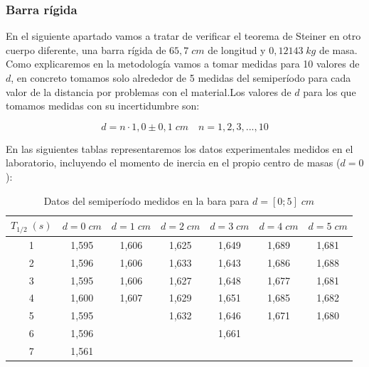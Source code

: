 \documentclass[a4paper,12pt,titlepage]{article}
\begin{document}
\subsubsection{Barra rígida}

En el siguiente apartado vamos a tratar de verificar el teorema de Steiner en otro cuerpo diferente, una barra rígida de $65,7 \; cm$ de longitud y $0,12143 \; kg$ de masa. Como explicaremos en la metodología vamos a tomar medidas para 10 valores de $d$, en concreto tomamos solo alrededor de 5 medidas del semiperíodo para cada valor de la distancia por problemas con el material.Los valores de $d$ para los que tomamos medidas con su incertidumbre son:

\begin{equation}
    d = n\cdot 1,0 \pm 0,1 \; cm \quad n = 1,2,3,...,10
\end{equation}

En las siguientes tablas representaremos los datos experimentales medidos en el laboratorio, incluyendo el momento de inercia en el propio centro de masas ($d=0$):

\begin{table}[h!]
    \centering
    \begin{tabular}{|c|c|c|c|c|c|c|}
    \hline
    $T_{1/2} \; (s)$ & $d=0 \;cm$& $d=1 \;cm$ & $d=2 \;cm$ & $d=3 \;cm$ & $d=4 \;cm$ & $d=5 \;cm$ \\ \hline
    1 & 1,595 & 1,606 & 1,625 & 1,649 & 1,689 & 1,681 \\ \hline
    2 & 1,596 & 1,606 & 1,633 & 1,643 & 1,686 & 1,688 \\ \hline
    3 & 1,595 & 1,606 & 1,627 & 1,648 & 1,677 & 1,681 \\ \hline
    4 & 1,600   & 1,607 & 1,629 & 1,651 & 1,685 & 1,682 \\ \hline
    5 & 1,595 &       & 1,632 & 1,646 & 1,671 & 1,680  \\ \hline
    6 & 1,596 &       &       & 1,661 &       &       \\ \hline
    7 & 1,561 &       &       &       &       &       \\ \hline
    \end{tabular}
    \caption{Datos del semiperíodo medidos en la bara para $d=[0;5] \; cm$}
    \label{Datos barra 1}
\end{table}
\end{document}
